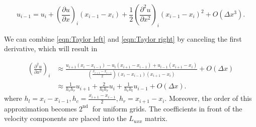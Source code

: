 \documentclass{article}
\begin{document}
\begin{equation}\label{eqn:Taylor left} 
	u_{i-1}=u_i+\left(\frac{\partial u}{\partial x}\right)_i\left(x_{i-1}-x_i\right)+\frac{1}{2}\left(\frac{\partial^2 u}{\partial x^2}\right)_i\left(x_{i-1}-x_i\right)^2+O\left(\Delta x^3\right).
\end{equation}

We can combine \eqref{eqn:Taylor left} and \eqref{eqn:Taylor right} by canceling the first derivative, which will result in

\begin{align}\label{eqn:laplacian-discretization-non-uniform-dx}
\left(\frac{\partial^2 u}{\partial x^2}\right)_i & \approx \frac{u_{i+1}\left(x_i-x_{i-1}\right)-u_i\left(x_{i+1}-x_{i-1}\right)+u_{i-1}\left(x_{i+1}-x_i\right)}{\left(\frac{x_{i+1}-x_{i-1}}{2}\right)\left(x_i-x_{i-1}\right)\left(x_{i+1}-x_i\right)}+O(\Delta x)\\
& \approx \frac{1}{h_c h_r}u_{i+1} + \frac{2}{h_l h_r}u_i + \frac{1}{h_c h_l}u_{i-1} + O(\Delta x).
\end{align}
where $h_l=x_i-x_{i-1},h_c = \frac{x_{i+1}-x_{i-1}}{2}, h_r = x_{i+1}-x_i$. Moreover, the order of this approximation becomes $2^{\text {nd }}$ for uniform grids. The coefficients in front of the velocity components are placed into the $L_{uxx}$ matrix.

\end{document}
